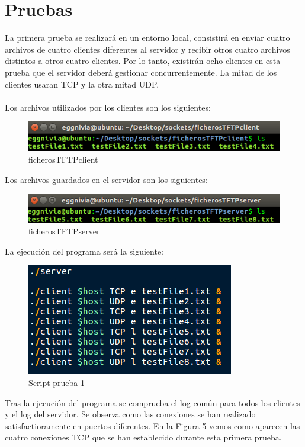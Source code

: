 \documentclass[journal, a4paper]{IEEEtran}
\begin{document}
\section{Pruebas}
La primera prueba se realizará en un entorno local, consistirá en enviar cuatro archivos de cuatro clientes diferentes al servidor y recibir otros cuatro archivos distintos a otros cuatro clientes. Por lo tanto, existirán ocho clientes en esta prueba que el servidor deberá gestionar concurrentemente. La mitad de los clientes usaran TCP y la otra mitad UDP.\\\\
Los archivos utilizados por los clientes son los siguientes:

\begin{figure}[H]
\centering
\includegraphics[scale=0.6]{images/client_before_1}
\caption{ficherosTFTPclient}
\end{figure}

Los archivos guardados en el servidor son los siguientes:

\begin{figure}[H]
\centering
\includegraphics[scale=0.6]{images/server_before_1}
\caption{ficherosTFTPserver}
\end{figure}

La ejecución del programa será la siguiente:

\begin{figure}[H]
\centering
\includegraphics[scale=0.6]{images/script_prueba_1}
\caption{Script prueba 1}
\end{figure}

Tras la ejecución del programa se comprueba el log común para todos los clientes y el log del servidor. Se observa como las conexiones se han realizado satisfactioramente en puertos diferentes. En la Figura 5 vemos como aparecen las cuatro conexiones TCP que se han establecido durante esta primera prueba.
\end{document}
